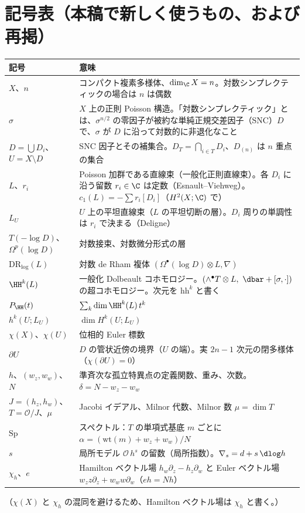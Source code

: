 \section{記号表（本稿で新しく使うもの、および再掲）}\label{sec:notation}
\begin{longtable}{>{\raggedright\arraybackslash}p{3.8cm}>{\raggedright\arraybackslash}p{11.2cm}}
\toprule 記号 & 意味\\ \midrule\endhead
$X$、$n$ & コンパクト複素多様体、$\dim_\C X=n$。対数シンプレクティックの場合は $n$ は偶数\\
$\sigma$ & $X$ 上の正則 Poisson 構造。「対数シンプレクティック」とは、$\sigma^{n/2}$ の零因子が被約な単純正規交差因子（SNC）$D$ で、$\sigma$ が $D$ に沿って対数的に非退化なこと\\
$D=\bigcup D_i$、$U=X\setminus D$ & SNC 因子とその補集合。$D_T=\bigcap_{i\in T}D_i$、$D_{(n)}$ は $n$ 重点の集合\\
$L$、$r_i$ & Poisson 加群である直線束（一般化正則直線束）。各 $D_i$ に沿う留数 $r_i\in\C$ は定数（Esnault--Viehweg）。$c_1(L)=-\sum r_i[D_i]$（$H^2(X;\C)$ で）\\
$L_U$ & $U$ 上の平坦直線束（$L$ の平坦切断の層）。$D_i$ 周りの単調性は $r_i$ で決まる（Deligne）\\
$T(-\log D)$、$\Omega^p(\log D)$ & 対数接束、対数微分形式の層\\
$\mathrm{DR}_{\log}(L)$ & 対数 de Rham 複体 $(\Omega^\bullet(\log D)\otimes L,\nabla)$\\
$\HH^k(L)$ & 一般化 Dolbeault コホモロジー。$(\wedge^\bullet T\otimes L,\ \dbar+[\sigma,\cdot])$ の超コホモロジー。次元を $\mathrm{hh}^k$ と書く\\
$P_{\HH}(t)$ & $\sum_k\dim\HH^k(L)\,t^k$\\
$h^k(U;L_U)$ & $\dim H^k(U;L_U)$\\
$\chi(X)$、$\chi(U)$ & 位相的 Euler 標数\\
$\partial U$ & $D$ の管状近傍の境界（$U$ の端）。実 $2n-1$ 次元の閉多様体（$\chi(\partial U)=0$）\\
$h$、$(w_z,w_w)$、$N$ & 準斉次な孤立特異点の定義関数、重み、次数。$\delta=N-w_z-w_w$\\
$J=(h_z,h_w)$、$T=\mathcal O/J$、$\mu$ & Jacobi イデアル、Milnor 代数、Milnor 数 $\mu=\dim T$\\
$\mathrm{Sp}$ & スペクトル：$T$ の単項式基底 $m$ ごとに $\alpha=(\mathrm{wt}(m)+w_z+w_w)/N$\\
$s$ & 局所モデル $\mathcal O\,h^s$ の留数（局所指数）。$\nabla_s=d+s\,\dlog h$\\
$\chi_h$、$e$ & Hamilton ベクトル場 $h_w\partial_z-h_z\partial_w$ と Euler ベクトル場 $w_zz\partial_z+w_ww\partial_w$（$e h=Nh$）\\
\bottomrule
\end{longtable}
（$\chi(X)$ と $\chi_h$ の混同を避けるため、Hamilton ベクトル場は $\chi_h$ と書く。）

